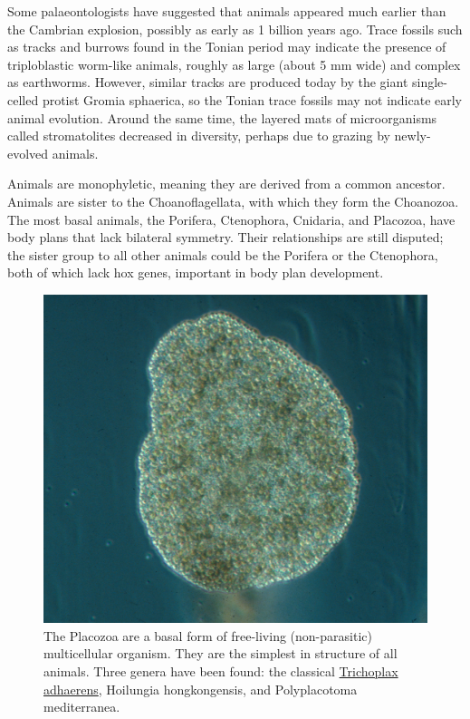 Some palaeontologists have suggested that animals appeared much earlier than the Cambrian explosion, possibly as early as 1 billion years ago. Trace fossils such as tracks and burrows found in the Tonian period may indicate the presence of triploblastic worm-like animals, roughly as large (about 5 mm wide) and complex as earthworms. However, similar tracks are produced today by the giant single-celled protist Gromia sphaerica, so the Tonian trace fossils may not indicate early animal evolution. Around the same time, the layered mats of microorganisms called stromatolites decreased in diversity, perhaps due to grazing by newly-evolved animals.

Animals are monophyletic, meaning they are derived from a common ancestor. Animals are sister to the Choanoflagellata, with which they form the Choanozoa. The most basal animals, the Porifera, Ctenophora, Cnidaria, and Placozoa, have body plans that lack bilateral symmetry. Their relationships are still disputed; the sister group to all other animals could be the Porifera or the Ctenophora, both of which lack hox genes, important in body plan development.



\begin{figure}

{\centering \includegraphics[width=0.7\linewidth]{./figures/animals/Trichoplax_adhaerens_photograph} 

}

\caption{The Placozoa are a basal form of free-living (non-parasitic) multicellular organism. They are the simplest in structure of all animals. Three genera have been found: the classical \href{https://commons.wikimedia.org/wiki/File:Trichoplax_adhaerens_photograph.png}{Trichoplax adhaerens}, Hoilungia hongkongensis, and Polyplacotoma mediterranea.}\label{fig:trichoplax}
\end{figure}

